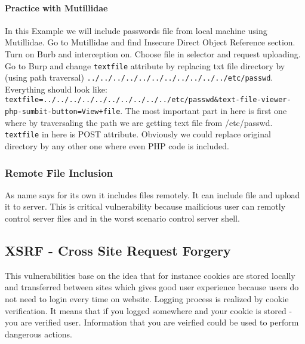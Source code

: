 \documentclass{article}[12pt]
\begin{document}
\paragraph{Practice with Mutillidae}
In this Example we will include passwords file from local machine using Mutillidae.
Go to Mutillidae and find Insecure Direct Object Reference section.
Turn on Burb and interception on.
Choose file in selector and request uploading.
Go to Burp and change \texttt{textfile} attribute by replacing txt file directory by (using path traversal) \texttt{../../../../../../../../../../../etc/passwd}.
Everything should look like: \texttt{textfile=../../../../../../../../../../etc/passwd\&text-file-viewer-php-sumbit-button=View+file}.
The most important part in here is first one where by traversaling the path we are getting text file from /etc/passwd. \texttt{textfile} in here is POST attribute.
Obviously we could replace original directory by any other one where even PHP code is included.

\subsubsection{Remote File Inclusion} As name says for its own it includes files remotely.
It can include file and upload it to server.
This is critical vulnerability because mailicious user can remotly control server files and in the worst scenario control server shell.



\subsection{XSRF - Cross Site Request Forgery}
This vulnerabilities base on the idea that for instance cookies are stored locally and transferred between sites which gives good user experience because users do not need to login every time on website.
Logging process is realized by cookie verification.
It means that if you logged somewhere and your cookie is stored - you are verified user.
Information that you are veirfied could be used to perform dangerous actions.
\end{document}
